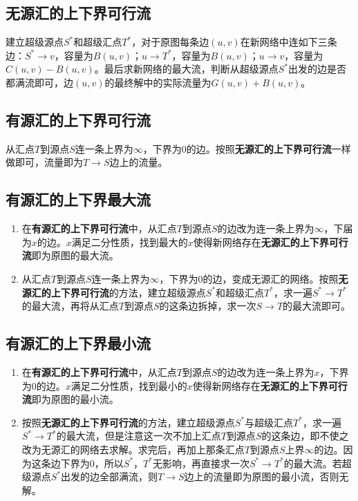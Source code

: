 \documentclass[landscape, oneside, a4paper, cs4size]{book}
\begin{document}
\begin{multicols}{2}
			\subsection{无源汇的上下界可行流}
			\begin{spacing}{0.8}
				建立超级源点$S^*$和超级汇点$T^*$，对于原图每条边$(u,v)$在新网络中连如下三条边：$S^* \rightarrow v$，容量为$B(u,v)$；$u \rightarrow T^*$，容量为$B(u,v)$；$u \rightarrow v$，容量为$C(u,v) - B(u,v)$。最后求新网络的最大流，判断从超级源点$S^*$出发的边是否都满流即可，边$(u,v)$的最终解中的实际流量为$G(u,v)+B(u,v)$。
			\end{spacing}
			\subsection{有源汇的上下界可行流}
			\begin{spacing}{0.8}
				从汇点$T$到源点$S$连一条上界为$\infty$，下界为$0$的边。按照\textbf{无源汇的上下界可行流}一样做即可，流量即为$T \rightarrow S$边上的流量。
			\end{spacing}
			\subsection{有源汇的上下界最大流}
			\begin{spacing}{0.8}
				\begin{enumerate}\setlength{\itemsep}{-\itemsep}
					\item 在\textbf{有源汇的上下界可行流}中，从汇点$T$到源点$S$的边改为连一条上界为$\infty$，下届为$x$的边。$x$满足二分性质，找到最大的$x$使得新网络存在\textbf{无源汇的上下界可行流}即为原图的最大流。
					\item 从汇点$T$到源点$S$连一条上界为$\infty$，下界为$0$的边，变成无源汇的网络。按照\textbf{无源汇的上下界可行流}的方法，建立超级源点$S^*$和超级汇点$T^*$，求一遍$S^* \rightarrow T^*$的最大流，再将从汇点$T$到源点$S$的这条边拆掉，求一次$S \rightarrow T$的最大流即可。
				\end{enumerate}
			\end{spacing}
			\subsection{有源汇的上下界最小流}
			\begin{spacing}{0.8}
				\begin{enumerate}\setlength{\itemsep}{-\itemsep}
					\item 在\textbf{有源汇的上下界可行流}中，从汇点$T$到源点$S$的边改为连一条上界为$x$，下界为$0$的边。$x$满足二分性质，找到最小的$x$使得新网络存在\textbf{无源汇的上下界可行流}即为原图的最小流。
					\item 按照\textbf{无源汇的上下界可行流}的方法，建立超级源点$S^*$与超级汇点$T^*$，求一遍$S^* \rightarrow T^*$的最大流，但是注意这一次不加上汇点$T$到源点$S$的这条边，即不使之改为无源汇的网络去求解。求完后，再加上那条汇点$T$到源点$S$上界$\infty$的边。因为这条边下界为$0$，所以$S^*$，$T^*$无影响，再直接求一次$S^* \rightarrow T^*$的最大流。若超级源点$S^*$出发的边全部满流，则$T \rightarrow S$边上的流量即为原图的最小流，否则无解。
				\end{enumerate}
			\end{spacing}

\end{multicols}
\end{document}

